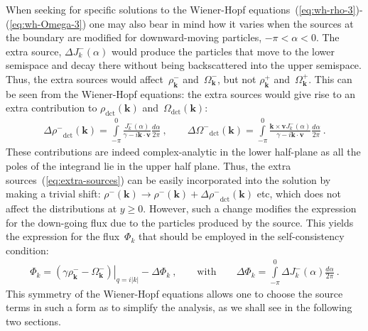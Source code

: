 \documentclass[preprint,aps,eqsecnum, prb]{revtex4-1}
\newcommand{\fplus}[1]{{#1}^{+}}
\newcommand{\fminus}[1]{{#1}^{-}}
\newcommand{\dct}[1]{{#1}_\mathrm{dct}}
\begin{document}
When seeking for specific solutions to the Wiener-Hopf
equations~(\ref{eq:wh-rho-3})-(\ref{eq:wh-Omega-3}) one may also
bear in mind how it varies when the sources at the boundary
are modified for downward-moving particles, $-\pi < \alpha < 0$.
The extra source, $\Delta J^{-}_k(\alpha)$ would produce the particles
that move to the lower semispace and decay there without being
backscattered into the upper semispace. Thus, the extra sources
would affect~$\fminus{\rho}_{\bm k}$ and~$\fminus{\Omega}_{\bm k}$,
but not  $\fplus{\rho}_{\bm k}$ and~$\fplus{\Omega}_{\bm k}$.
This can be seen from the Wiener-Hopf equations: the extra sources
would give rise to an extra contribution to $\dct{\rho}({\bm k})$
and~$\Omega_\mathrm{dct}({\bm k})$:
\begin{align}
  \label{eq:extra-sources}
\Delta \dct{\fminus{\rho}}({\bm k}) =
\int\limits_{-\pi}^{0} \frac{\fminus{J}_k(\alpha)}{\gamma - i {\bm k}\cdot{\bm v}}
\frac{d\alpha}{2\pi}\ ,
\qquad
\Delta \dct{\fminus{\Omega}}({\bm k}) =
\int\limits_{-\pi}^{0} \frac{{\bm k}\times{\bm v}\fminus{J}_k(\alpha)}{
            \gamma - i {\bm k}\cdot{\bm v}}
\frac{d\alpha}{2\pi}\ .
\end{align}
These contributions are indeed complex-analytic in the lower half-plane
as all the poles of the integrand lie in the upper half plane.
Thus, the extra sources~(\ref{eq:extra-sources}) can be easily incorporated
into the solution by making a trivial  shift: $\fminus{\rho}({\bm k})
\to \fminus{\rho}({\bm k}) + \Delta\dct{\fminus{\rho}}({\bm k})$ etc,
which does not affect the distributions at $y \geq 0$.
However, such a change modifies the expression for the down-going flux
due to the particles produced by the source. This yields
the expression for the flux~$\Phi_{k}$ that should be employed
in the self-consistency condition:
\begin{align}
  \label{eq:delta-phi}
\Phi_{k} = \left. \left(\gamma \fminus{\rho}_{\bm k}
-  \fminus{\Omega}_{\bm k} \right)\right|_{q = i |k|} - \Delta\Phi_{k}\ ,
\qquad
\mathrm{with}\qquad
\Delta\Phi_{k} = \int\limits_{-\pi}^{0} \Delta \fminus{J}_{k}(\alpha)
\frac{d\alpha}{2\pi}\ .
\end{align}
This symmetry of the Wiener-Hopf equations allows one to choose the
source terms in such a form as to simplify the analysis, as we shall
see in the following two sections.

\end{document}
